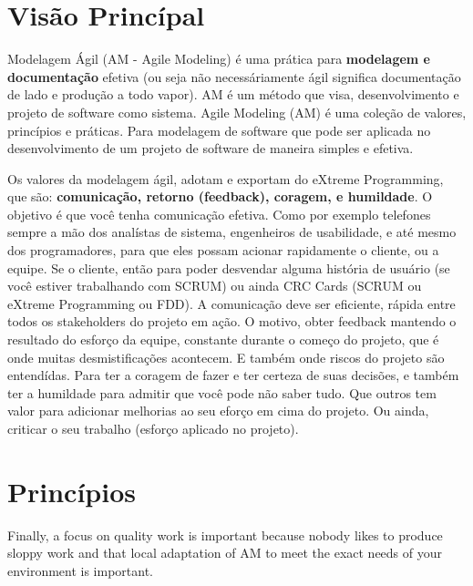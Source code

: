 \documentclass[conference]{IEEEtran}
\begin{document}
\section{Visão Princípal}
Modelagem Ágil (AM - Agile Modeling) é uma prática para {\bfseries modelagem e documentação} efetiva (ou seja não necessáriamente ágil significa documentação de lado e produção a todo vapor). AM é um método que visa, desenvolvimento e projeto de software como sistema. Agile Modeling (AM) é uma coleção de valores, princípios e práticas. Para modelagem de software que pode ser aplicada no desenvolvimento de um projeto de software de maneira simples e efetiva.

Os valores da modelagem ágil, adotam e exportam do eXtreme Programming, que são: {\bfseries comunicação, retorno (feedback), coragem, e humildade}. O objetivo é que você tenha comunicação efetiva. Como por exemplo telefones sempre a mão dos analístas de sistema, engenheiros de usabilidade, e até mesmo dos programadores, para que eles possam acionar rapidamente o cliente, ou a equipe. Se o cliente, então para poder desvendar alguma história de usuário (se você estiver trabalhando com SCRUM) ou ainda CRC Cards (SCRUM ou eXtreme Programming ou FDD). A comunicação deve ser eficiente, rápida entre todos os stakeholders do projeto em ação. O motivo, obter feedback mantendo o resultado do esforço da equipe, constante durante o começo do projeto, que é onde muitas desmistificações acontecem. E também onde riscos do projeto são entendídas. Para ter a coragem de fazer e ter certeza de suas decisões, e também ter a humildade para admitir que você pode não saber tudo. Que outros tem valor para adicionar melhorias ao seu eforço em cima do projeto. Ou ainda, criticar o seu trabalho (esforço aplicado no projeto).

\section{Princípios}
Finally, a focus on quality work is important because nobody likes to produce sloppy work and that local adaptation of AM to meet the exact needs of your environment is important.
\end{document}
